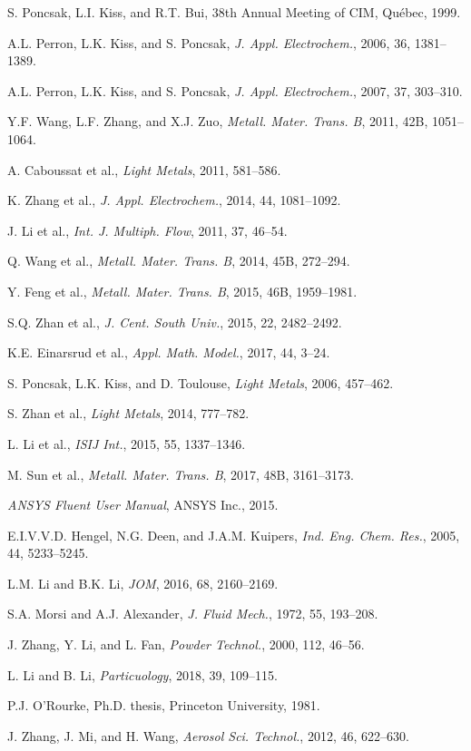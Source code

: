 \documentclass[UTF8,zihao=-4,fontset=fandol]{ctexart}
\begin{document}
\begin{enumerate}[label={[\arabic*]},leftmargin=2.8em,itemsep=0.15em]
\item S. Poncsak, L.I. Kiss, and R.T. Bui, 38th Annual Meeting of CIM, Qu\'ebec, 1999.
\item A.L. Perron, L.K. Kiss, and S. Poncsak, \emph{J. Appl. Electrochem.}, 2006, 36, 1381--1389.
\item A.L. Perron, L.K. Kiss, and S. Poncsak, \emph{J. Appl. Electrochem.}, 2007, 37, 303--310.
\item Y.F. Wang, L.F. Zhang, and X.J. Zuo, \emph{Metall. Mater. Trans. B}, 2011, 42B, 1051--1064.
\item A. Caboussat et al., \emph{Light Metals}, 2011, 581--586.
\item K. Zhang et al., \emph{J. Appl. Electrochem.}, 2014, 44, 1081--1092.
\item J. Li et al., \emph{Int. J. Multiph. Flow}, 2011, 37, 46--54.
\item Q. Wang et al., \emph{Metall. Mater. Trans. B}, 2014, 45B, 272--294.
\item Y. Feng et al., \emph{Metall. Mater. Trans. B}, 2015, 46B, 1959--1981.
\item S.Q. Zhan et al., \emph{J. Cent. South Univ.}, 2015, 22, 2482--2492.
\item K.E. Einarsrud et al., \emph{Appl. Math. Model.}, 2017, 44, 3--24.
\item S. Poncsak, L.K. Kiss, and D. Toulouse, \emph{Light Metals}, 2006, 457--462.
\item S. Zhan et al., \emph{Light Metals}, 2014, 777--782.
\item L. Li et al., \emph{ISIJ Int.}, 2015, 55, 1337--1346.
\item M. Sun et al., \emph{Metall. Mater. Trans. B}, 2017, 48B, 3161--3173.
\item \emph{ANSYS Fluent User Manual}, ANSYS Inc., 2015.
\item E.I.V.V.D. Hengel, N.G. Deen, and J.A.M. Kuipers, \emph{Ind. Eng. Chem. Res.}, 2005, 44, 5233--5245.
\item L.M. Li and B.K. Li, \emph{JOM}, 2016, 68, 2160--2169.
\item S.A. Morsi and A.J. Alexander, \emph{J. Fluid Mech.}, 1972, 55, 193--208.
\item J. Zhang, Y. Li, and L. Fan, \emph{Powder Technol.}, 2000, 112, 46--56.
\item L. Li and B. Li, \emph{Particuology}, 2018, 39, 109--115.
\item P.J. O'Rourke, Ph.D. thesis, Princeton University, 1981.
\item J. Zhang, J. Mi, and H. Wang, \emph{Aerosol Sci. Technol.}, 2012, 46, 622--630.

\end{enumerate}
\end{document}
